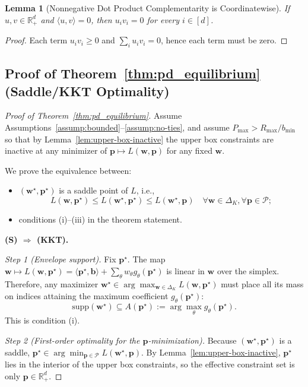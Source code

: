 \documentclass[11pt]{article}
\newtheorem{lemma}[theorem]{Lemma}
\newcommand{\bb}{\mathbf{b}}
\newcommand{\bp}{\mathbf{p}}
\newcommand{\bw}{\mathbf{w}}
\newcommand{\R}{\mathbb{R}}
\newcommand{\cP}{\mathcal{P}}
\begin{document}
\begin{lemma}[Nonnegative Dot Product Complementarity is Coordinatewise]
\label{lem:coordwise-complementarity}
If $u, v \in \R_+^d$ and $\langle u, v \rangle = 0$, then $u_i v_i = 0$ for every $i \in [d]$.
\end{lemma}

\begin{proof}
Each term $u_i v_i \ge 0$ and $\sum_i u_i v_i = 0$, hence each term must be zero.
\end{proof}

\subsection{Proof of Theorem~\ref{thm:pd_equilibrium} (Saddle/KKT Optimality)}

\begin{proof}[Proof of Theorem~\ref{thm:pd_equilibrium}]
Assume Assumptions~\ref{assump:bounded}--\ref{assump:no-ties}, and assume $P_{\max} > R_{\max}/b_{\min}$ so that by Lemma~\ref{lem:upper-box-inactive} the upper box constraints are inactive at any minimizer of $\bp \mapsto L(\bw, \bp)$ for any fixed $\bw$.

We prove the equivalence between:
\begin{itemize}
\item[(S)] $(\bw^\star, \bp^\star)$ is a saddle point of $L$, i.e.,
\[
L(\bw, \bp^\star) \le L(\bw^\star, \bp^\star) \le L(\bw^\star, \bp) \quad \forall \bw \in \Delta_K, \forall \bp \in \cP;
\]
\item[(KKT)] conditions (i)--(iii) in the theorem statement.
\end{itemize}

\textbf{(S) $\Rightarrow$ (KKT).}

\emph{Step 1 (Envelope support).}
Fix $\bp^\star$. The map $\bw \mapsto L(\bw, \bp^\star) = \langle \bp^\star, \bb \rangle + \sum_{\theta} w_\theta g_\theta(\bp^\star)$ is linear in $\bw$ over the simplex. Therefore, any maximizer $\bw^\star \in \arg\max_{\bw \in \Delta_K} L(\bw, \bp^\star)$ must place all its mass on indices attaining the maximum coefficient $g_\theta(\bp^\star)$:
\[
\mathrm{supp}(\bw^\star) \subseteq A(\bp^\star) := \arg\max_{\theta} g_\theta(\bp^\star).
\]
This is condition (i).

\emph{Step 2 (First-order optimality for the $\bp$-minimization).}
Because $(\bw^\star, \bp^\star)$ is a saddle, $\bp^\star \in \arg\min_{\bp \in \cP} L(\bw^\star, \bp)$.
By Lemma~\ref{lem:upper-box-inactive}, $\bp^\star$ lies in the interior of the upper box constraints, so the effective constraint set is only $\bp \in \R_+^d$.


\end{proof}
\end{document}
